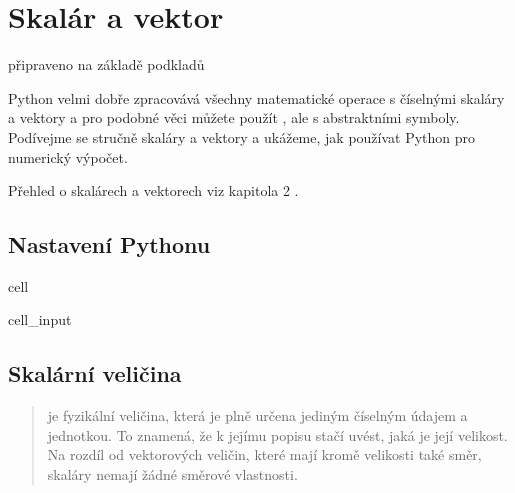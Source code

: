 \documentclass[letterpaper,10pt,english]{jupyterBook}
\begin{document}
\sphinxstepscope


\chapter{Skalár a vektor}
\label{\detokenize{Prednasky/0_2_Skal_xe1ry_a_vektory:skalar-a-vektor}}\label{\detokenize{Prednasky/0_2_Skal_xe1ry_a_vektory::doc}}
\sphinxAtStartPar
připraveno na základě podkladů 

\sphinxAtStartPar
Python velmi dobře zpracovává všechny matematické operace s číselnými skaláry a vektory a pro podobné věci můžete použít , ale s abstraktními symboly. Podívejme se stručně skaláry a vektory a ukážeme, jak používat Python pro numerický výpočet.

\sphinxAtStartPar
Přehled o skalárech a vektorech viz kapitola 2 .


\section{Nastavení Pythonu}
\label{\detokenize{Prednasky/0_2_Skal_xe1ry_a_vektory:nastaveni-pythonu}}
\begin{sphinxuseclass}{cell}\begin{sphinxVerbatimInput}

\begin{sphinxuseclass}{cell_input}
\begin{sphinxVerbatim}[commandchars=\\\{\}]
   
 
   
\end{sphinxVerbatim}

\end{sphinxuseclass}\end{sphinxVerbatimInput}

\end{sphinxuseclass}

\section{Skalární veličina}
\label{\detokenize{Prednasky/0_2_Skal_xe1ry_a_vektory:skalarni-velicina}}\begin{quote}

\sphinxAtStartPar
{} je fyzikální veličina, která je plně určena jediným číselným údajem a jednotkou. To znamená, že k jejímu popisu stačí uvést, jaká je její velikost. Na rozdíl od vektorových veličin, které mají kromě velikosti také směr, skaláry nemají žádné směrové vlastnosti.
\end{quote}
\end{document}
